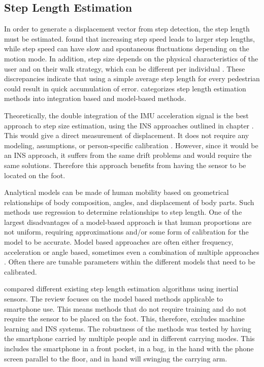

\subsection{Step Length Estimation}
\label{sec:step_length_estimation}
In order to generate a displacement vector from step detection, the step length must be estimated. \citet{Collins2013a} found that increasing step speed leads to larger step lengths, while step speed can have slow and spontaneous fluctuations depending on the motion mode. In addition, step size depends on the physical characteristics of the user and on their walk strategy, which can be different per individual \cite{Diez2018}. These discrepancies indicate that using a simple average step length for every pedestrian could result in quick accumulation of error. \citet{Diez2018} categorizes step length estimation methods into integration based and model-based methods. \par

Theoretically, the double integration of the \ac{IMU} acceleration signal is the best approach to step size estimation, using the INS approaches outlined in chapter . This would give a direct measurement of displacement. It does not require any modeling, assumptions, or person-specific calibration \cite{Diez2018}. However, since it would be an INS approach, it suffers from the same drift problems and would require the same solutions. Therefore this approach benefits from having the sensor to be located on the foot. \par 

Analytical models can be made of human mobility based on geometrical relationships of body composition, angles, and displacement of body parts. Such methods use regression to determine relationships to step length.  One of the largest disadvantages of a model-based approach is that human proportions are not uniform, requiring approximations and/or some form of calibration for the model to be accurate. Model based approaches are often either frequency, acceleration or angle based, sometimes even a combination of multiple approaches \cite{Vezocnik2019}. Often there are tunable parameters within the different models that need to be calibrated.

\citet{Vezocnik2019} compared different existing step length estimation algorithms using inertial sensors. The review focuses on the model based methods applicable to smartphone use. This means methods that do not require training and do not require the sensor to be placed on the foot. This, therefore, excludes machine learning and INS systems. The robustness of the methods was tested by having the smartphone carried by multiple people and in different carrying modes. This includes the smartphone in a front pocket, in a bag, in the hand with the phone screen parallel to the floor, and in hand will swinging the carrying arm. \par 


